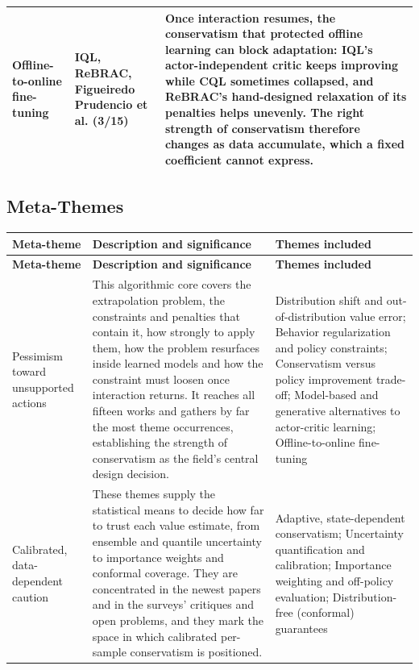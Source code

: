\documentclass[11pt]{article}
\newcommand{\bookmarked}[3]{#1*{#3}\phantomsection\addcontentsline{toc}{#2}{#3}}
\begin{document}
{\begin{longtable}{P{3.4cm} P{3.6cm} P{8.2cm}}
\addlinespace
Offline-to-online fine-tuning & IQL, ReBRAC, Figueiredo Prudencio et al. (3/15) & Once interaction resumes, the conservatism that protected offline learning can block adaptation: IQL's actor-independent critic keeps improving while CQL sometimes collapsed, and ReBRAC's hand-designed relaxation of its penalties helps unevenly. The right strength of conservatism therefore changes as data accumulate, which a fixed coefficient cannot express. \\
\bottomrule
\end{longtable}}

\bookmarked{\subsection}{subsection}{Meta-Themes}

{\small
\begin{longtable}{P{3.4cm} P{6.6cm} P{5.2cm}}
\toprule
\textbf{Meta-theme} & \textbf{Description and significance} & \textbf{Themes included} \\
\midrule
\endfirsthead
\toprule
\textbf{Meta-theme} & \textbf{Description and significance} & \textbf{Themes included} \\
\midrule
\endhead
Pessimism toward unsupported actions & This algorithmic core covers the extrapolation problem, the constraints and penalties that contain it, how strongly to apply them, how the problem resurfaces inside learned models and how the constraint must loosen once interaction returns. It reaches all fifteen works and gathers by far the most theme occurrences, establishing the strength of conservatism as the field's central design decision. & Distribution shift and out-of-distribution value error; Behavior regularization and policy constraints; Conservatism versus policy improvement trade-off; Model-based and generative alternatives to actor-critic learning; Offline-to-online fine-tuning \\
\addlinespace
Calibrated, data-dependent caution & These themes supply the statistical means to decide how far to trust each value estimate, from ensemble and quantile uncertainty to importance weights and conformal coverage. They are concentrated in the newest papers and in the surveys' critiques and open problems, and they mark the space in which calibrated per-sample conservatism is positioned. & Adaptive, state-dependent conservatism; Uncertainty quantification and calibration; Importance weighting and off-policy evaluation; Distribution-free (conformal) guarantees \\

\end{longtable}}
\end{document}
